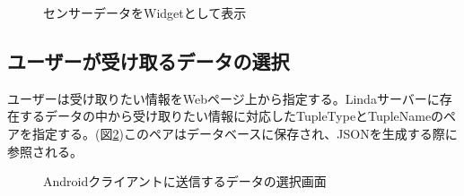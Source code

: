 \begin{figure}[htbp]
  \begin{minipage}{\hsize}
    \begin{center}
    \end{center}
    \caption{センサーデータをWidgetとして表示}
    \label{fig:sensor_widget}
  \end{minipage}
\end{figure}

\subsection{ユーザーが受け取るデータの選択}

ユーザーは受け取りたい情報をWebページ上から指定する。Lindaサーバーに存在するデータの中から受け取りたい情報に対応したTupleTypeとTupleNameのペアを指定する。(図\ref{fig:select})このペアはデータベースに保存され、JSONを生成する際に参照される。

\begin{figure}[htbp]
  \begin{minipage}{\hsize}
    \begin{center}
    \end{center}
    \caption{Androidクライアントに送信するデータの選択画面}
    \label{fig:select}
  \end{minipage}
\end{figure}

